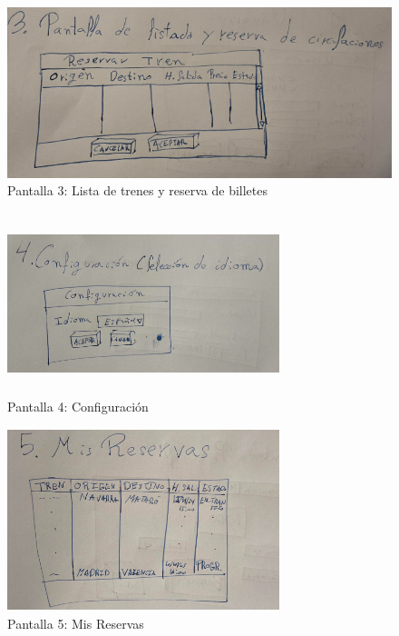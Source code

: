\begin{figure}
    \centering
    \includegraphics{recursos/prototipos/reservar_tren}
    \caption[width=120px,height=200px]{Pantalla 3: Lista de trenes y reserva de billetes}
    \label{fig:reservar_tren}
\end{figure}
\begin{figure}
    \centering
    \includegraphics[width=300px,height=200px]{recursos/prototipos/elegir_idioma}
    \caption{Pantalla 4: Configuración}
    \label{fig:elegir_idioma}
\end{figure}

\begin{figure}
    \centering
    \includegraphics[width=300px,height=200px]{recursos/prototipos/mis_reservas}
    \caption{Pantalla 5: Mis Reservas}
    \label{fig:mis_reservas}
\end{figure}

